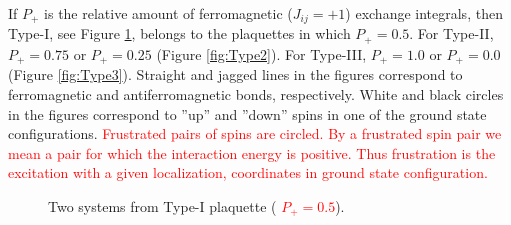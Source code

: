 \documentclass[preprint,12pt]{elsarticle}
\begin{document}
	If $P_+$ is the relative amount of ferromagnetic ($J_{ij}=+1$) exchange integrals, then Type-I, see Figure \ref{fig:Type1}, belongs to the plaquettes in which $P_+=0.5$. For Type-II, $P_+=0.75$ or $P_+=0.25$ (Figure \ref{fig:Type2}). For Type-III, $P_+=1.0$ or $P_+=0.0$ (Figure \ref{fig:Type3}). Straight and jagged lines in the figures correspond to ferromagnetic and antiferromagnetic bonds, respectively. White and black circles in the figures correspond to ''up'' and ''down'' spins in one of the ground state configurations. \textcolor{red}{Frustrated pairs of spins are circled. By a frustrated spin pair we mean a pair for which the interaction energy is positive. Thus frustration is the excitation with a given localization, coordinates in ground state configuration.}
	
	
	\begin{figure}[H]
		\centering
		\begin{minipage}[t]{0.3\textwidth}
			\centering
			\hspace{-4pt} 
			\caption{Two systems from Type-I plaquette (\textcolor{red}{  $P_+=0.5$}).}
			\label{fig:Type1} 
		\end{minipage}
		\hspace{5pt} 

\end{figure}
\end{document}
